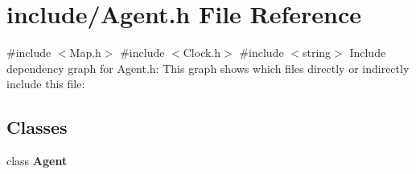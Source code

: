 \section{include/\+Agent.h File Reference}
\label{_agent_8h}
{\ttfamily \#include $<$Map.\+h$>$}\newline
{\ttfamily \#include $<$Clock.\+h$>$}\newline
{\ttfamily \#include $<$string$>$}\newline
Include dependency graph for Agent.\+h\+:
This graph shows which files directly or indirectly include this file\+:
\subsection*{Classes}
\begin{DoxyCompactItemize}
\item 
class \textbf{ Agent}
\end{DoxyCompactItemize}
